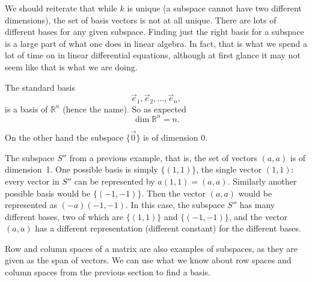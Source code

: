 \documentclass{ximera}
\begin{document}

We should reiterate that while $k$ is unique (a subspace cannot have two different dimensions), the set of basis vectors is not at all unique.  There are lots of different bases for any given subspace.  Finding just the right basis for a subspace is a large part of what one does in linear algebra.  In fact, that is what we spend a lot of time on in linear differential equations, although at first glance it may not seem like that is what we are doing.

\begin{example}
    The standard basis
    \begin{equation*}
        \vec{e}_1, \vec{e}_2, \ldots, \vec{e}_n ,
    \end{equation*}
    is a basis of ${\mathbb R}^n$ (hence the name). So as expected
    \begin{equation*}
        \dim {\mathbb R}^n = n .
    \end{equation*}
    
    On the other hand the subspace $\{ \vec{0} \}$ is of dimension $0$.
    
    The subspace $S''$ from a previous example, that is, the set of vectors $(a,a)$ is of dimension~1.  One possible basis is simply $\{ (1,1) \}$, the single vector $(1,1)$: every vector in $S''$ can be represented by $a (1,1) = (a,a)$.  Similarly another possible basis would be $\{ (-1,-1) \}$.  Then the vector $(a,a)$ would be represented as $(-a) (-1,-1)$. In this case, the subspace $S''$ has many different bases, two of which are $\{(1,1)\}$ and $\{(-1,-1)\}$, and the vector $(a,a)$ has a different representation (different constant) for the different bases.
\end{example}

Row and column spaces of a matrix are also examples of subspaces, as they are given as the span of vectors. We can use what we know about row spaces and column spaces from the previous section to find a basis.
\end{document}
